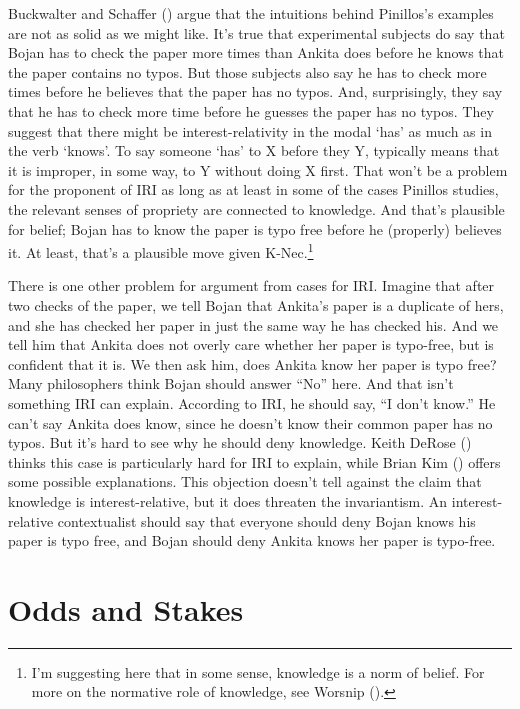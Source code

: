 \documentclass[
  10pt,
  letterpaper,
  DIV=11,
  numbers=noendperiod,
  twoside]{scrartcl}
\begin{document}
Buckwalter and Schaffer ()
argue that the intuitions behind Pinillos's examples are not as solid as
we might like. It's true that experimental subjects do say that Bojan
has to check the paper more times than Ankita does before he knows that
the paper contains no typos. But those subjects also say he has to check
more times before he believes that the paper has no typos. And,
surprisingly, they say that he has to check more time before he guesses
the paper has no typos. They suggest that there might be
interest-relativity in the modal `has' as much as in the verb `knows'.
To say someone `has' to X before they Y, typically means that it is
improper, in some way, to Y without doing X first. That won't be a
problem for the proponent of IRI as long as at least in some of the
cases Pinillos studies, the relevant senses of propriety are connected
to knowledge. And that's plausible for belief; Bojan has to know the
paper is typo free before he (properly) believes it. At least, that's a
plausible move given K-Nec.\footnote{I'm suggesting here that in some
  sense, knowledge is a norm of belief. For more on the normative role
  of knowledge, see Worsnip ().}

There is one other problem for argument from cases for IRI. Imagine that
after two checks of the paper, we tell Bojan that Ankita's paper is a
duplicate of hers, and she has checked her paper in just the same way he
has checked his. And we tell him that Ankita does not overly care
whether her paper is typo-free, but is confident that it is. We then ask
him, does Ankita know her paper is typo free? Many philosophers think
Bojan should answer ``No'' here. And that isn't something IRI can
explain. According to IRI, he should say, ``I don't know.'' He can't say
Ankita does know, since he doesn't know their common paper has no typos.
But it's hard to see why he should deny knowledge. Keith DeRose
() thinks this case is particularly
hard for IRI to explain, while Brian Kim ()
offers some possible explanations. This objection doesn't tell against
the claim that knowledge is interest-relative, but it does threaten the
invariantism. An interest-relative contextualist should say that
everyone should deny Bojan knows his paper is typo free, and Bojan
should deny Ankita knows her paper is typo-free.

\section{Odds and Stakes}\label{oddsandstakes}
\end{document}
